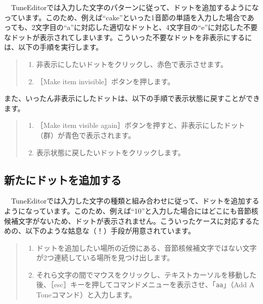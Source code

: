 　TuneEditorでは入力した文字のパターンに従って、ドットを追加するようになっています。このため、例えば``cake''といった1音節の単語を入力した場合であっても、2文字目の``a''に対応した適切なドットと、4文字目の``e''に対応した不要なドットが表示されてしまいます。こういった不要なドットを非表示にするには、以下の手順を実行します。

\begin{quote}
\begin{enumerate}
\item 非表示にしたいドットをクリックし、赤色で表示させます。
\item ［Make item invisible］ボタンを押します。
\end{enumerate}
\end{quote}


また、いったん非表示にしたドットは、以下の手順で表示状態に戻すことができます。

\begin{quote}
\begin{enumerate}
\item ［Make item visible again］ボタンを押すと、非表示にしたドット（群）が青色で表示されます。
\item 表示状態に戻したいドットをクリックします。
\end{enumerate}
\end{quote}

\subsection{新たにドットを追加する}

　TuneEditorでは入力した文字の種類と組み合わせに従って、ドットを追加するようになっています。このため、例えば``10''と入力した場合にはどこにも音節核候補文字がないため、ドットが表示されません。こういったケースに対応するための、以下のような姑息な（！）手段が用意されています。

\begin{quote}
\begin{enumerate}
\item ドットを追加したい場所の近傍にある、音節核候補文字\textsf{ではない}文字が2つ連続している場所を見つけ出します。
\item それら文字の\textsf{間}でマウスをクリックし、テキストカーソルを移動した後、［esc］キーを押してコマンドメニューを表示させ、「\texttt{aa}」（Add A Toneコマンド）と入力します。
\end{enumerate}
\end{quote}


